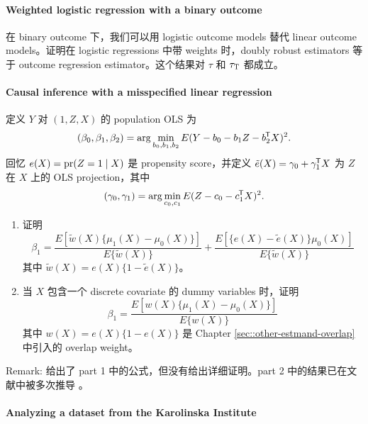 \paragraph{Weighted logistic regression  with a binary outcome}
\label{hw::wlogit-dr}
在 binary outcome 下，我们可以用 logistic outcome models 替代 linear outcome models。证明在 logistic regressions 中带 weights 时，doubly robust estimators 等于 outcome regression estimator。这个结果对 $\tau$ 和 $\tau_\textsc{T}$ 都成立。



\paragraph{Causal inference with a misspecified linear regression}




定义 $Y$ 对 $ (1, Z, X) $ 的 population OLS 为
$$
(\beta_0, \beta_1, \beta_2) = \arg\min_{b_0, b_1, b_2}   E(Y - b_0 - b_1 Z - b_2^{\mkern-1.5mu\mathsf{T}} X)^2. 
$$
回忆 $e(X) = \textup{pr}(Z=1\mid X)$ 是 propensity score，并定义 $\tilde{e}(X) = \gamma_0+\gamma_1^{\mkern-1.5mu\mathsf{T}} X$ 为 $Z$ 在 $X$ 上的 OLS projection，其中%
$$
(\gamma_0, \gamma_1) =  \arg\min_{c_0, c_1}   E(Z - c_0 -  c_1^{\mkern-1.5mu\mathsf{T}} X)^2. 
$$

\begin{enumerate}
\item
证明
$$
\beta_1 = \frac{    E [  \tilde{w}(X) \{ \mu_1(X) - \mu_0(X) \} ]  }{   E \{ \tilde{w}(X) \} }
+ \frac{  E [  \{  e(X) - \tilde{e}(X)  \}  \mu_0(X)  ] }{  E \{ \tilde{w}(X) \}  }
$$
其中 $\tilde{w}(X) = e(X)\{ 1 - \tilde{e}(X)  \}$。

\item
当 $X$ 包含一个 discrete covariate 的 dummy variables 时，证明
$$
\beta_1 = \frac{    E [  w(X) \{ \mu_1(X) - \mu_0(X) \} ]  }{   E \{ w(X) \} }
$$
其中 $w(X) = e(X)\{ 1 - e(X)  \}$ 是 Chapter \ref{sec::other-estmand-overlap} 中引入的 overlap weight。

\end{enumerate}


Remark: \citet{vansteelandt2021assumption} 给出了 part 1 中的公式，但没有给出详细证明。part 2 中的结果已在文献中被多次推导 \citep[e.g.,][]{angrist1998estimating, ding2021frisch}。


\paragraph{Analyzing a dataset from the Karolinska Institute}\label{hw::Karolinska-pscore}


